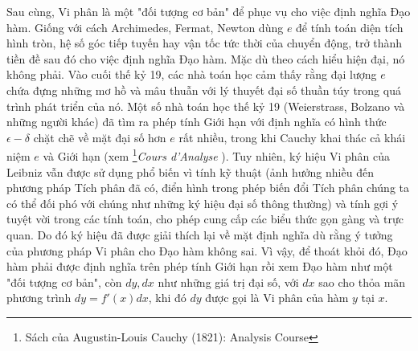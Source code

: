 \documentclass[a4paper,12pt]{article}
\begin{document}
Sau cùng, Vi phân là một "đối tượng cơ bản" để phục vụ cho việc định nghĩa Đạo hàm. Giống với cách Archimedes, Fermat, Newton dùng $e$ để tính toán diện tích hình tròn, hệ số góc tiếp tuyến hay vận tốc tức thời của chuyển động, trở thành tiền đề sau đó cho việc định nghĩa Đạo hàm. Mặc dù theo cách hiểu hiện đại, nó không phải. Vào cuối thế kỷ 19, các nhà toán học cảm thấy rằng đại lượng $e$ chứa đựng những mơ hồ và mâu thuẫn với lý thuyết đại số thuần túy trong quá trình phát triển của nó. Một số nhà toán học thế kỷ 19 (Weierstrass, Bolzano và những người khác) đã tìm ra phép tính Giới hạn với định nghĩa có hình thức $\epsilon - \delta$ chặt chẽ về mặt đại số hơn $e$ rất nhiều, trong khi Cauchy khai thác cả khái niệm $e$ và Giới hạn (xem \footnote{Sách của Augustin-Louis Cauchy (1821): Analysis Course}\textit{Cours d'Analyse} ). Tuy nhiên, ký hiệu Vi phân của Leibniz vẫn được sử dụng phổ biến vì tính kỹ thuật (ảnh hưởng nhiều đến phương pháp Tích phân đã có, điển hình trong phép biến đổi Tích phân chúng ta có thể đối phó với chúng như những ký hiệu đại số thông thường) và tính gợi ý tuyệt vời trong các tính toán, cho phép cung cấp các biểu thức gọn gàng và trực quan. Do đó ký hiệu đã được giải thích lại về mặt định nghĩa dù rằng ý tưởng của phương pháp Vi phân cho Đạo hàm không sai. Vì vậy, để thoát khỏi đó, Đạo hàm phải được định nghĩa trên phép tính Giới hạn rồi xem Đạo hàm như một "đối tượng cơ bản", còn $dy, dx$ như những giá trị đại số, với $dx$ sao cho thỏa mãn phương trình $dy=f'(x)dx$, khi đó $dy$ được gọi là Vi phân của hàm $y$ tại $x$.
\end{document}
